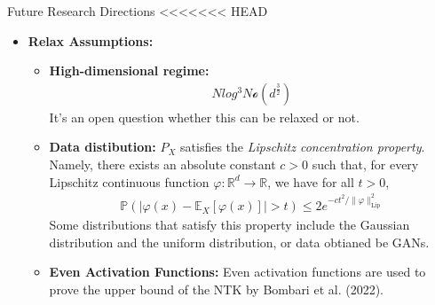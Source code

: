 \documentclass[serif, aspectratio=169]{beamer}
\begin{document}
\begin{frame}{Future Research Directions}
<<<<<<< HEAD
	\begin{itemize}
		\item \textbf{Relax Assumptions:}
		\begin{itemize}
			\item \textbf{High-dimensional regime: }
			\begin{align*}
				N log^{3} N \mathcal{o}(d^{\frac{3}{2}})
			\end{align*}
			It's an open question whether this can be relaxed or not.
			\item \textbf{Data distibution: }
			$P_X$ satisfies the \textit{Lipschitz concentration property}. Namely, there exists an absolute constant $c > 0$ such that, for every Lipschitz continuous function $\varphi : \mathbb{R}^d \to \mathbb{R}$, we have for all $t > 0$,
			\begin{align*}
				\mathbb{P}\left( \left| \varphi(x) - \mathbb{E}_X[\varphi(x)] \right| > t \right) \leq 2e^{-ct^2 / \|\varphi\|_{\text{Lip}}^2}
			\end{align*}
			Some distributions that satisfy this property include the Gaussian distribution and the uniform distribution, or data obtianed be GANs.
			\item \textbf{Even Activation Functions: }
			Even activation functions are used to prove the upper bound of the NTK by Bombari et al. (2022).  
		\end{itemize}
	\end{itemize}
\end{frame}
\end{document}
